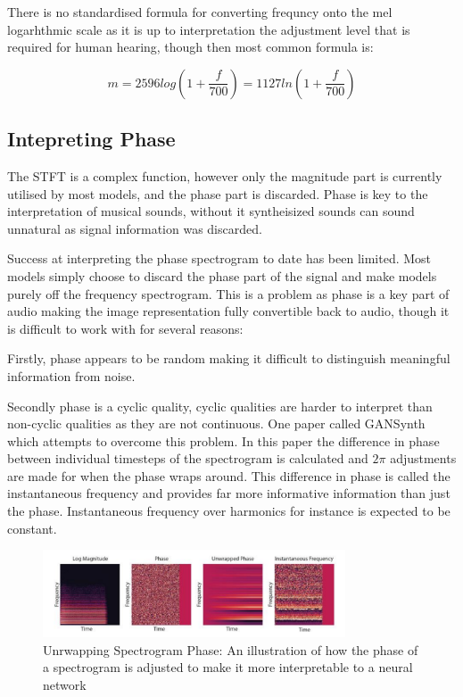 There is no standardised formula for converting frequncy onto the mel logarhthmic scale as it is up to interpretation the adjustment level that is required for human hearing, though then most common formula is\cite{SpeechCommunication}:

\begin{equation}
    m = 2596 log(1 +  \frac{f}{700}) = 1127 ln (1 + \frac{f}{700})
\end{equation}

\subsection{Intepreting Phase}

The STFT is a complex function, however only the magnitude part is currently utilised by most models, and the phase part is discarded. Phase is key to the interpretation of musical sounds, without it syntheisized sounds can sound unnatural as signal information was discarded.

Success at interpreting the phase spectrogram to date has been limited. Most models simply choose to discard the phase part of the signal and make models purely off the frequency spectrogram. This is a problem as phase is a key part of audio making the image representation fully convertible back to audio, though it is difficult to work with for several reasons:

Firstly, phase appears to be random making it difficult to distinguish meaningful information from noise.

Secondly phase is a cyclic quality, cyclic qualities are harder to interpret than non-cyclic qualities as they are not continuous. One paper called GANSynth\cite{GANSynth} which attempts to overcome this problem. In this paper the difference in phase between individual timesteps of the spectrogram is calculated and $2\pi$ adjustments are made for when the phase wraps around. This difference in phase is called the instantaneous frequency and provides far more informative information than just the phase. Instantaneous frequency over harmonics for instance is expected to be constant.

\begin{figure}
    \centering
    \includegraphics[width=0.8\textwidth]{literature_review/PhaseAdjustment.png}
    \caption{Unrwapping Spectrogram Phase: An illustration of how the phase of a spectrogram is adjusted to make it more interpretable to a neural network\cite{GANSynth}}
    \label{fig:phase_unwrapping}
\end{figure}

